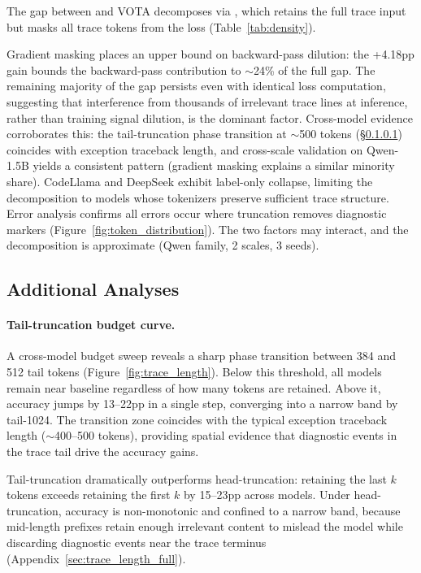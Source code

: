 The gap between  and VOTA decomposes via , which retains the full trace input but masks all trace tokens from the loss (Table~\ref{tab:density}).

Gradient masking places an upper bound on backward-pass dilution: the +4.18pp gain bounds the backward-pass contribution to ${\sim}$24\% of the full gap.
The remaining majority of the gap persists even with identical loss computation, suggesting that interference from thousands of irrelevant trace lines at inference, rather than training signal dilution, is the dominant factor.
Cross-model evidence corroborates this: the tail-truncation phase transition at ${\sim}$500 tokens (\S\ref{sec:trace_length}) coincides with exception traceback length, and cross-scale validation on Qwen-1.5B yields a consistent pattern (gradient masking explains a similar minority share).
CodeLlama and DeepSeek exhibit label-only collapse, limiting the decomposition to models whose tokenizers preserve sufficient trace structure.
Error analysis confirms all  errors occur where truncation removes diagnostic markers (Figure~\ref{fig:token_distribution}).
The two factors may interact, and the decomposition is approximate (Qwen family, 2 scales, 3 seeds).

\subsection{Additional Analyses}
\label{sec:additional}

\paragraph{Tail-truncation budget curve.}
\label{sec:trace_length}
A cross-model budget sweep reveals a sharp phase transition between 384 and 512 tail tokens (Figure~\ref{fig:trace_length}).
Below this threshold, all models remain near baseline regardless of how many tokens are retained.
Above it, accuracy jumps by 13--22pp in a single step, converging into a narrow band by tail-1024.
The transition zone coincides with the typical exception traceback length (${\sim}$400--500 tokens), providing spatial evidence that diagnostic events in the trace tail drive the accuracy gains.

Tail-truncation dramatically outperforms head-truncation: retaining the last $k$ tokens exceeds retaining the first $k$ by 15--23pp across models.
Under head-truncation, accuracy is non-monotonic and confined to a narrow band, because mid-length prefixes retain enough irrelevant content to mislead the model while discarding diagnostic events near the trace terminus (Appendix~\ref{sec:trace_length_full}).

